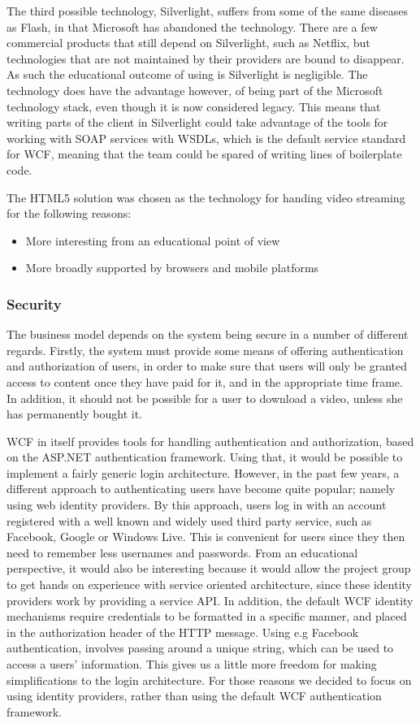The third possible technology, Silverlight, suffers from some of the same diseases as Flash, in that Microsoft has abandoned the technology. There are a few commercial products that still depend on Silverlight, such as Netflix, but technologies that are not maintained by their providers are bound to disappear. As such the educational outcome of using is Silverlight is negligible. The technology does have the advantage however, of being part of the Microsoft technology stack, even though it is now considered legacy. This means that writing parts of the client in Silverlight could take advantage of the tools for working with SOAP services with WSDLs, which is the default service standard for WCF, meaning that the team could be spared of writing lines of boilerplate code.

The HTML5 solution was chosen as the technology for handing video streaming for the following reasons:
\begin{itemize}
\item More interesting from an educational point of view
\item More broadly supported by browsers and mobile platforms
\end{itemize}

\subsubsection{Security} \label{Security}
The business model depends on the system being secure in a number of different regards. Firstly, the system must provide some means of offering authentication and authorization of users, in order to make sure that users will only be granted access to content once they have paid for it, and in the appropriate time frame. In addition, it should not be possible for a user to download a video, unless she has permanently bought it.

WCF in itself provides tools for handling authentication and authorization, based on the ASP.NET authentication framework\cite[chapter.~7]{MLB}. Using that, it would be possible to implement a fairly generic login architecture. However, in the past few years, a different approach to authenticating users have become quite popular; namely using web identity providers. By this approach, users log in with an account registered with a well known and widely used third party service, such as Facebook, Google or Windows Live. This is convenient for users since they then need to remember less usernames and passwords. From an educational perspective, it would also be interesting because it would allow the project group to get hands on experience with service oriented architecture, since these identity providers work by providing a service API. In addition, the default WCF identity mechanisms require credentials to be formatted in a specific manner, and placed in the authorization header of the HTTP message. Using e.g Facebook authentication, involves passing around a unique string, which can be used to access a users' information\cite{FB}. This gives us a little more freedom for making simplifications to the login architecture. For those reasons we decided to focus on using identity providers, rather than using the default WCF authentication framework.

